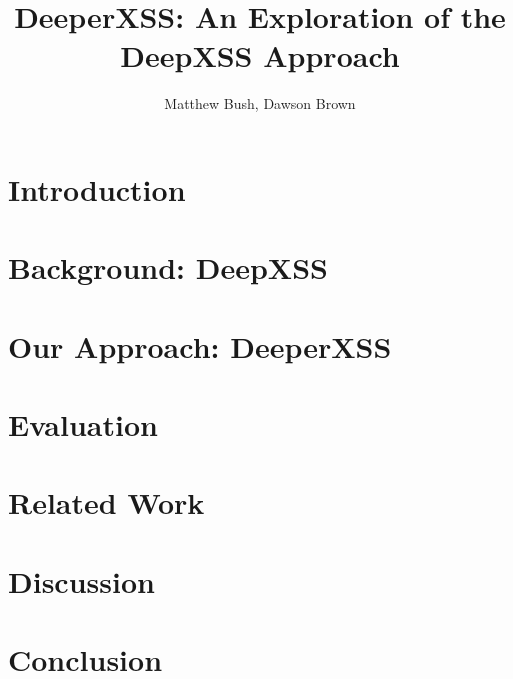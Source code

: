 \documentclass[sigconf]{acmart}
\begin{document}
\title{DeeperXSS: An Exploration of the DeepXSS Approach}

\author{Matthew Bush, Dawson Brown}




\begin{abstract}

\end{abstract}


\maketitle


\section{Introduction}
\label{sec:introduction}


\section{Background: DeepXSS}
\label{sec:background}


\section{Our Approach: DeeperXSS}
\label{sec:method}


\section{Evaluation}
\label{sec:evaluation}


\section{Related Work}
\label{sec:related}


\section{Discussion}
\label{sec:discussion}


\section{Conclusion}
\label {sec:conclusion}




\end{document}
